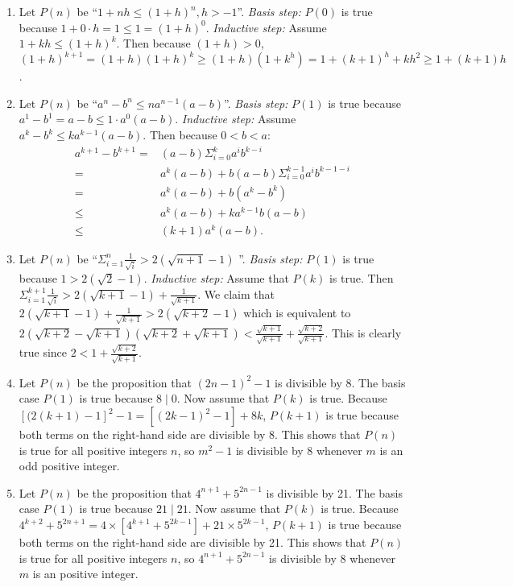 \documentclass{../../cls/sig-alternate-05-2015}
\begin{document}
\begin{enumerate}
\item Let $P(n)$ be \textquotedblleft $1 + nh \le (1 + h)^n, h > -1$\textquotedblright.
\textit{Basis step:} $P(0)$ is true because $1 + 0 \cdot h = 1 \le 1 = (1 + h)^0$.
\textit{Inductive step:} Assume $1 + kh \le (1 + h)^k$. Then because
$(1+h) > 0$, $(1 + h)^{k + 1} = (1 + h)(1 + h)^k \ge (1 + h)(1 + k^h) = 1 + (k + 1)^h + kh^2 \ge 1 + (k + 1)h$.
	
\item Let $P(n)$ be \textquotedblleft $a^n - b^n \le na^{n - 1}(a - b)$\textquotedblright. \textit{Basis step:} $P(1)$ is true because $a^1 - b^1 = a - b \le 1 \cdot a^0 (a - b)$. \textit{Inductive step:} Assume $a^k - b^k \le k a^{k - 1}(a - b)$. Then because $0 < b < a$: \begin{align}
	a^{k + 1} - b^{k + 1} = & (a - b)\Sigma_{i = 0}^k a^i b^{k - i}\\
	= & a^k(a - b) + b(a - b) \Sigma_{i = 0}^{k - 1} a^i b^{k - 1 - i}\\
	= & a^k(a - b) + b(a^k - b^k)\\
	\le & a^k(a - b) + k a^{k - 1} b(a - b)\\
	\le & (k + 1) a^k (a - b).
\end{align}

\item Let $P(n)$ be \textquotedblleft $\Sigma_{i = 1}^n \frac{1}{\sqrt{i}} > 2(\sqrt{n + 1} - 1)$ \textquotedblright. \textit{Basis step:} $P(1)$ is true because $1 > 2(\sqrt{2} - 1)$. \textit{Inductive step:} Assume that $P(k)$ is true. Then $\Sigma_{i = 1}^{k + 1} \frac{1}{\sqrt{i}} > 2(\sqrt{k + 1} - 1) + \frac{1}{\sqrt{k + 1}}$. We claim that $2(\sqrt{k + 1} - 1) + \frac{1}{\sqrt{k + 1}} > 2(\sqrt{k + 2} - 1)$ which is equivalent to $2(\sqrt{k + 2} - \sqrt{k + 1}) (\sqrt{k + 2} + \sqrt{k + 1}) < \frac{\sqrt{k + 1}}{\sqrt{k + 1}} + \frac{\sqrt{k + 2}}{\sqrt{k + 1}}$. This is clearly true since $2 < 1 + \frac{\sqrt{k + 2}}{\sqrt{k + 1}}$.

\item Let $P(n)$ be the proposition that $(2n - 1)^2 - 1$ is divisible by
8. The basis case $P(1)$ is true because $8 \mid 0$. Now assume
that $P(k)$ is true. Because $[(2(k + 1) - 1]^2 − 1 =
[(2k - 1)^2 - 1] + 8k$, $P(k + 1)$ is true because both terms on
the right-hand side are divisible by 8. This shows that $P(n)$ is true for all positive integers $n$, so $m^2 − 1$ is divisible by
8 whenever $m$ is an odd positive integer.

\item Let $P(n)$ be the proposition that $4^{n + 1} + 5^{2n - 1}$ is divisible by
21. The basis case $P(1)$ is true because $21 \mid 21$. Now assume
that $P(k)$ is true. Because $4^{k + 2} + 5^{2n + 1} = 4 \times [4^{k + 1} + 5^{2k - 1}] + 21 \times 5^{2k - 1}$, $P(k + 1)$ is true because both terms on
the right-hand side are divisible by 21. This shows that $P(n)$ is true for all positive integers $n$, so $4^{n + 1} + 5^{2n - 1}$ is divisible by
8 whenever $m$ is an positive integer.


\end{enumerate}
\end{document}
